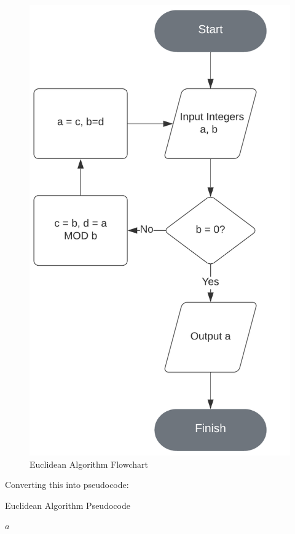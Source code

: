 \documentclass{article}
\begin{document}
\begin{figure}[h]
    \centering
    \caption{Euclidean Algorithm Flowchart}
    \captionsetup{justification=centering}
    \includegraphics[scale=0.9]{euclidean-algorithm-flowchart}
\end{figure}
\clearpage
Converting this into pseudocode:

\begin{algorithm}
    \caption{Euclidean Algorithm Pseudocode}
    \begin{algorithmic}
                \State \Return $a$
            \Else
                \State\Return{}
            \EndIf
        \EndFunction
    \end{algorithmic}
\end{algorithm}
\end{document}
